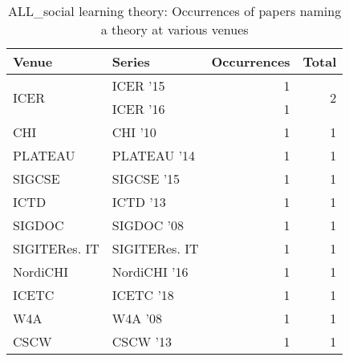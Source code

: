\begin{table*}[t]
\begin{tabular}{llrr}
Venue & Series & Occurrences & Total\\\hline
\multirow{2}{*}{ICER } & ICER '15 & 1 & \multirow{2}{*}{2}\\
& ICER '16 & 1 &\\
\multirow{1}{*}{CHI } & CHI '10 & 1 & \multirow{1}{*}{1}\\
\multirow{1}{*}{PLATEAU } & PLATEAU '14 & 1 & \multirow{1}{*}{1}\\
\multirow{1}{*}{SIGCSE } & SIGCSE '15 & 1 & \multirow{1}{*}{1}\\
\multirow{1}{*}{ICTD } & ICTD '13 & 1 & \multirow{1}{*}{1}\\
\multirow{1}{*}{SIGDOC } & SIGDOC '08 & 1 & \multirow{1}{*}{1}\\
\multirow{1}{*}{SIGITERes. IT} & SIGITERes. IT & 1 & \multirow{1}{*}{1}\\
\multirow{1}{*}{NordiCHI } & NordiCHI '16 & 1 & \multirow{1}{*}{1}\\
\multirow{1}{*}{ICETC } & ICETC '18 & 1 & \multirow{1}{*}{1}\\
\multirow{1}{*}{W4A } & W4A '08 & 1 & \multirow{1}{*}{1}\\
\multirow{1}{*}{CSCW } & CSCW '13 & 1 & \multirow{1}{*}{1}\\
\end{tabular}
\caption{ALL\_social learning theory: Occurrences of papers naming a theory at various venues}
\end{table*}
